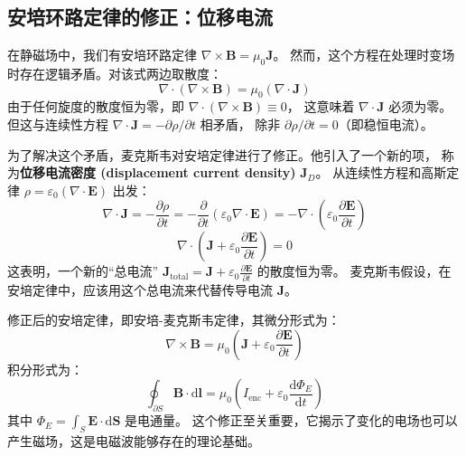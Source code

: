 \documentclass[fontset=none]{ctexart}
\begin{document}
\subsection{安培环路定律的修正：位移电流}
在静磁场中，我们有安培环路定律 $\nabla \times \bm{B} = \mu_0 \bm{J}$。
然而，这个方程在处理时变场时存在逻辑矛盾。对该式两边取散度：
\begin{equation}
    \nabla \cdot (\nabla \times \bm{B}) = \mu_0 (\nabla \cdot \bm{J})
\end{equation}
由于任何旋度的散度恒为零，即 $\nabla \cdot (\nabla \times \bm{B}) \equiv 0$，
这意味着 $\nabla \cdot \bm{J}$ 必须为零。但这与连续性方程 
$\nabla \cdot \bm{J} = -\partial\rho/\partial t$ 相矛盾，
除非 $\partial\rho/\partial t = 0$（即稳恒电流）。

为了解决这个矛盾，麦克斯韦对安培定律进行了修正。他引入了一个新的项，
称为\textbf{位移电流密度 (displacement current density)} $\bm{J}_D$。
从连续性方程和高斯定律 $\rho = \varepsilon_0 (\nabla \cdot \bm{E})$ 出发：
\begin{equation}
    \nabla \cdot \bm{J} = -\frac{\partial\rho}{\partial t} 
    = -\frac{\partial}{\partial t} (\varepsilon_0 \nabla \cdot \bm{E}) 
    = -\nabla \cdot \left(\varepsilon_0 \frac{\partial \bm{E}}{\partial t}\right)
\end{equation}
\begin{equation}
    \nabla \cdot \left(\bm{J} + \varepsilon_0 \frac{\partial \bm{E}}{\partial t}\right) = 0
\end{equation}
这表明，一个新的“总电流” $\bm{J}_{\text{total}} 
= \bm{J} + \varepsilon_0 \frac{\partial \bm{E}}{\partial t}$ 的散度恒为零。
麦克斯韦假设，在安培定律中，应该用这个总电流来代替传导电流 $\bm{J}$。
\begin{law}[安培-麦克斯韦定律]
    修正后的安培定律，即安培-麦克斯韦定律，其微分形式为：
    \begin{equation}
        \nabla \times \bm{B} 
        = \mu_0 \left(\bm{J} + \varepsilon_0 \frac{\partial \bm{E}}{\partial t}\right)
    \end{equation}
    积分形式为：
    \begin{equation}
        \oint_{\partial S} \bm{B} \cdot \mathrm{d}\bm{l} 
        = \mu_0 \left(I_{\text{enc}} + \varepsilon_0 \frac{\mathrm{d}\Phi_E}{\mathrm{d}t}\right)
    \end{equation}
    其中 $\Phi_E = \int_S \bm{E} \cdot \mathrm{d}\bm{S}$ 是电通量。
    这个修正至关重要，它揭示了变化的电场也可以产生磁场，这是电磁波能够存在的理论基础。
\end{law}
\end{document}
